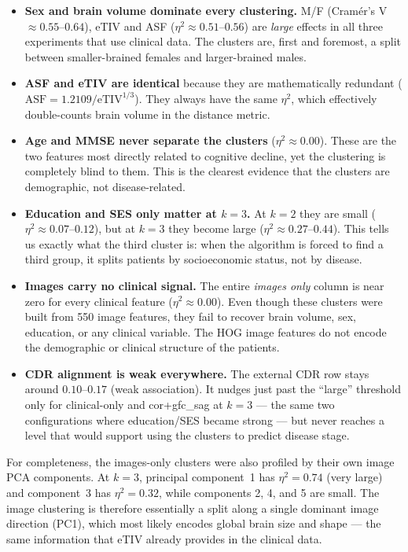 \documentclass[12pt, a4paper]{article}
\begin{document}
\begin{itemize}
    \item \textbf{Sex and brain volume dominate every clustering.} M/F
    (Cramér's V $\approx 0.55$--$0.64$), eTIV and ASF ($\eta^2 \approx 0.51$--$0.56$)
    are \emph{large} effects in all three experiments that use clinical data. The clusters
    are, first and foremost, a split between smaller-brained females and larger-brained males.

    \item \textbf{ASF and eTIV are identical} because they are mathematically redundant
    ($\text{ASF} = 1.2109/\text{eTIV}^{1/3}$). They always have the same $\eta^2$, which
    effectively double-counts brain volume in the distance metric.

    \item \textbf{Age and MMSE never separate the clusters} ($\eta^2 \approx 0.00$).
    These are the two features most directly related to cognitive decline, yet the
    clustering is completely blind to them. This is the clearest evidence that the
    clusters are demographic, not disease-related.

    \item \textbf{Education and SES only matter at $k=3$.} At $k=2$ they are small
    ($\eta^2 \approx 0.07$--$0.12$), but at $k=3$ they become large
    ($\eta^2 \approx 0.27$--$0.44$). This tells us exactly what the third cluster is:
    when the algorithm is forced to find a third group, it splits patients by
    socioeconomic status, not by disease.

    \item \textbf{Images carry no clinical signal.} The entire \emph{images only} column
    is near zero for every clinical feature ($\eta^2 \approx 0.00$). Even though these
    clusters were built from 550 image features, they fail to recover brain volume, sex,
    education, or any clinical variable. The HOG image features do not encode the
    demographic or clinical structure of the patients.

    \item \textbf{CDR alignment is weak everywhere.} The external CDR row stays around
    $0.10$--$0.17$ (weak association). It nudges just past the ``large'' threshold only for
    clinical-only and cor+gfc\_sag at $k=3$ --- the same two configurations where
    education/SES became strong --- but never reaches a level that would support using the
    clusters to predict disease stage.
\end{itemize}

For completeness, the images-only clusters were also profiled by their own image PCA
components. At $k=3$, principal component~1 has $\eta^2 = 0.74$ (very large) and
component~3 has $\eta^2 = 0.32$, while components 2, 4, and 5 are small. The image
clustering is therefore essentially a split along a single dominant image direction (PC1),
which most likely encodes global brain size and shape --- the same information that eTIV
already provides in the clinical data.
\end{document}
